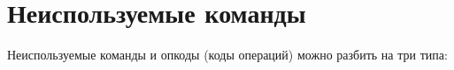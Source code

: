 \documentclass[forwardcom.tex]{subfiles}
\begin{document}
\section{Неиспользуемые команды} \label{unusedInstructions}
Неиспользуемые команды и опкоды (коды операций) можно разбить на три типа:
%
%
%
%
%
%
%
%
%
%
\end{document}
